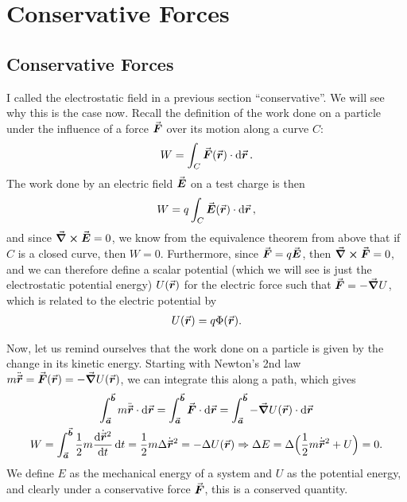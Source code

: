 \chapter{Conservative Forces}

\section{Conservative Forces}

I called the electrostatic field in a previous section ``conservative''.
We will see why this is the case now.
Recall the definition of the work done on a particle under the influence of a force $\va*{F}$ over its motion along a curve $C$:
\begin{eqnarray}
    W = \int_{C} \va*{F}(\va*{r}) \cdot \dd{\va*{r}}
.\end{eqnarray}
The work done by an electric field $\va*{E}$ on a test charge is then
\begin{eqnarray}
    W = q \int_{C} \va*{E}(\va*{r}) \cdot \dd{\va*{r}}
,\end{eqnarray}
and since $\curl{\va*{E}} = 0$, we know from the equivalence theorem from above that if $C$ is a closed curve, then $W = 0$.
Furthermore, since $\va*{F} = q \va*{E}$, then $\curl{\va*{F}} = 0$, and we can therefore define a scalar potential (which we will see is just the electrostatic potential energy) $U(\va*{r})$ for the electric force such that $\va*{F} = - \grad U$, which is related to the electric potential by
\begin{eqnarray}
    U(\va*{r}) = q \Phi(\va*{r})
.\end{eqnarray}

Now, let us remind ourselves that the work done on a particle is given by the change in its kinetic energy.
Starting with Newton's 2nd law $m \ddot{\va*{r}} = \va*{F}(\va*{r}) = - \grad U(\va*{r})$, we can integrate this along a path, which gives
\begin{gather}
    \int_{\va*{a}}^{\va*{b}} m \ddot{\va*{r}} \cdot \dd{\va*{r}} = \int_{\va*{a}}^{\va*{b}} \va*{F} \cdot \dd{\va*{r}} = \int_{\va*{a}}^{\va*{b}} -\grad U(\va*{r}) \cdot \dd{\va*{r}} \nonumber \\
    W = \int_{\va*{a}}^{\va*{b}} \frac{1}{2} m \dv{\dot{\va*{r}}^2}{t} \dd{t} = \frac{1}{2} m \Delta \dot{\va*{r}}^2 = - \Delta U(\va*{r})
    \Rightarrow \Delta E = \Delta \Big( \frac{1}{2} m \dot{\va*{r}}^2 + U \Big) = 0
.\end{gather}
We define $E$ as the mechanical energy of a system and $U$ as the potential energy, and clearly under a conservative force $\va*{F}$, this is a conserved quantity.


